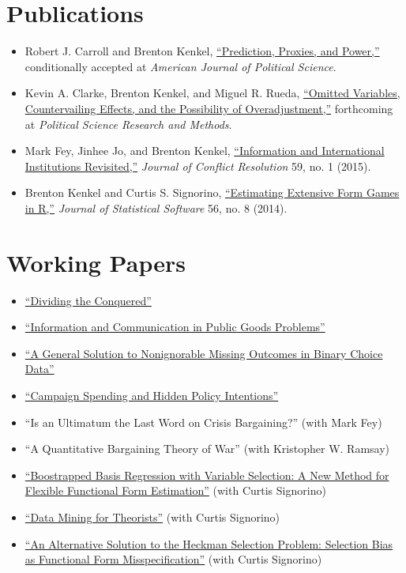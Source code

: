 \documentclass[11pt]{article}
\begin{document}
\section{Publications}\label{publications}

\begin{itemize}
\item
  Robert J. Carroll and Brenton Kenkel,
  \href{http://bkenkel.com/data/doe.pdf}{``Prediction, Proxies, and
  Power,''} conditionally accepted at \emph{American Journal of
  Political Science}.
\item
  Kevin A. Clarke, Brenton Kenkel, and Miguel R. Rueda,
  \href{http://www.rochester.edu/college/psc/clarke/MissProp.pdf}{``Omitted
  Variables, Countervailing Effects, and the Possibility of
  Overadjustment,''} forthcoming at \emph{Political Science Research and
  Methods}.
\item
  Mark Fey, Jinhee Jo, and Brenton Kenkel,
  \href{http://dx.doi.org/10.1177/0022002713503285}{``Information and
  International Institutions Revisited,''} \emph{Journal of Conflict
  Resolution} 59, no. 1 (2015).
\item
  Brenton Kenkel and Curtis S. Signorino,
  \href{http://www.jstatsoft.org/v56/i08}{``Estimating Extensive Form
  Games in R,''} \emph{Journal of Statistical Software} 56, no. 8
  (2014).
\end{itemize}

\section{Working Papers}\label{working-papers}

\begin{itemize}
\item
  \href{http://bkenkel.com/data/divconq.pdf}{``Dividing the Conquered''}
\item
  \href{http://bkenkel.com/data/talk.pdf}{``Information and
  Communication in Public Goods Problems''}
\item
  \href{http://bkenkel.com/data/idlogit.pdf}{``A General Solution to
  Nonignorable Missing Outcomes in Binary Choice Data''}
\item
  \href{http://bkenkel.com/data/valence.pdf}{``Campaign Spending and
  Hidden Policy Intentions''}
\item
  ``Is an Ultimatum the Last Word on Crisis Bargaining?'' (with Mark
  Fey)
\item
  ``A Quantitative Bargaining Theory of War'' (with Kristopher W.
  Ramsay)
\item
  \href{http://bkenkel.com/data/basics.pdf}{``Boostrapped Basis
  Regression with Variable Selection: A New Method for Flexible
  Functional Form Estimation''} (with Curtis Signorino)
\item
  \href{http://polmeth.wustl.edu/mediaDetail.php?docId=1278}{``Data
  Mining for Theorists''} (with Curtis Signorino)
\item
  \href{http://polmeth.wustl.edu/mediaDetail.php?docId=1359}{``An
  Alternative Solution to the Heckman Selection Problem: Selection Bias
  as Functional Form Misspecification''} (with Curtis Signorino)
\end{itemize}
\end{document}
